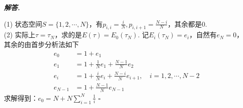 \documentclass[10pt, a4paper, oneside]{ctexart}
\newenvironment{solution}{%
  \par\noindent\textbf{\textit{解答. }}\ignorespaces
}{%
  \hfill\ensuremath{\square}\par %
}
\begin{document}
\begin{solution}
    (1) 状态空间$S=\{1,2,\cdots,N\}$，有$p_{i,i}=\frac{i}{N},p_{i,i+1}=\frac{N-i}{N}$，其余都是$0$.\\
    (2) 实际上$\tau=\tau_{N}$，求的是$E(\tau)=E_{0}(\tau_N)$. 记$E_i(\tau_N)=e_i$，自然有$e_N=0$，其余的由首步分析法如下
    \begin{align*}
        e_0&=1+e_1\\
        e_1&=1+\frac{1}{N}e_1+\frac{N-1}{N}e_2\\
        e_i&=1+\frac{i}{N}e_i+\frac{N-i}{N}e_{i+1},\quad i=1,2,\cdots,N-2\\
        e_{N-1}&=1+\frac{N-1}{N}e_{N-1}
    \end{align*}
    求解得到：$e_0=N+N\sum_{i=1}^N \frac{1}{i}$
\end{solution}
\end{document}
